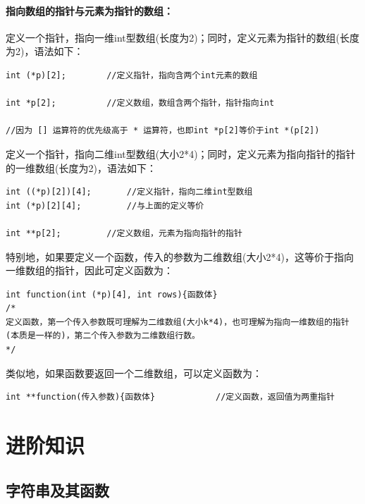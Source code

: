 \documentclass[zihao=-4,UTF8]{report}
\begin{document}
\subsubsection{指向数组的指针与元素为指针的数组：}
定义一个指针，指向一维int型数组(长度为2)；同时，定义元素为指针的数组(长度为2)，语法如下：
\begin{lstlisting}
int (*p)[2];        //定义指针，指向含两个int元素的数组

int *p[2];          //定义数组，数组含两个指针，指针指向int

//因为 [] 运算符的优先级高于 * 运算符，也即int *p[2]等价于int *(p[2])
\end{lstlisting}\par
定义一个指针，指向二维int型数组(大小2*4)；同时，定义元素为指向指针的指针的一维数组(长度为2)，语法如下：
\begin{lstlisting}
int ((*p)[2])[4];       //定义指针，指向二维int型数组
int (*p)[2][4];         //与上面的定义等价

int **p[2];         //定义数组，元素为指向指针的指针
\end{lstlisting}\par
特别地，如果要定义一个函数，传入的参数为二维数组(大小2*4)，这等价于指向一维数组的指针，因此可定义函数为：
\begin{lstlisting}
int function(int (*p)[4], int rows){函数体}   
/*
定义函数，第一个传入参数既可理解为二维数组(大小k*4)，也可理解为指向一维数组的指针
(本质是一样的)，第二个传入参数为二维数组行数。
*/

\end{lstlisting}
类似地，如果函数要返回一个二维数组，可以定义函数为：
\begin{lstlisting}
int **function(传入参数){函数体}            //定义函数，返回值为两重指针
\end{lstlisting}
\chapter{进阶知识}
\section{字符串及其函数}
\end{document}
